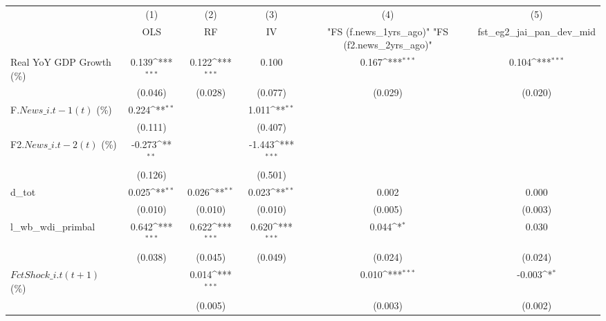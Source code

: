 {
\def\sym#1{\ifmmode^{#1}\else\(^{#1}\)\fi}
\begin{tabular}{l*{5}{c}}
\toprule
                    &\multicolumn{1}{c}{(1)}&\multicolumn{1}{c}{(2)}&\multicolumn{1}{c}{(3)}&\multicolumn{1}{c}{(4)}&\multicolumn{1}{c}{(5)}\\
                    &\multicolumn{1}{c}{OLS}&\multicolumn{1}{c}{RF}&\multicolumn{1}{c}{IV}&\multicolumn{1}{c}{ "FS (f.news\_1yrs\_ago)"  "FS (f2.news\_2yrs\_ago)" }&\multicolumn{1}{c}{fst\_eg2\_jai\_pan\_dev\_mid}\\
\midrule
Real YoY GDP Growth (\%)&       0.139\sym{***}&       0.122\sym{***}&       0.100         &       0.167\sym{***}&       0.104\sym{***}\\
                    &     (0.046)         &     (0.028)         &     (0.077)         &     (0.029)         &     (0.020)         \\
\addlinespace
F.$ News\_{i.t-1}(t)$ (\%)&       0.224\sym{**} &                     &       1.011\sym{**} &                     &                     \\
                    &     (0.111)         &                     &     (0.407)         &                     &                     \\
\addlinespace
F2.$ News\_{i.t-2}(t)$ (\%)&      -0.273\sym{**} &                     &      -1.443\sym{***}&                     &                     \\
                    &     (0.126)         &                     &     (0.501)         &                     &                     \\
\addlinespace
d\_tot               &       0.025\sym{**} &       0.026\sym{**} &       0.023\sym{**} &       0.002         &       0.000         \\
                    &     (0.010)         &     (0.010)         &     (0.010)         &     (0.005)         &     (0.003)         \\
\addlinespace
l\_wb\_wdi\_primbal    &       0.642\sym{***}&       0.622\sym{***}&       0.620\sym{***}&       0.044\sym{*}  &       0.030         \\
                    &     (0.038)         &     (0.045)         &     (0.049)         &     (0.024)         &     (0.024)         \\
\addlinespace
$ FctShock\_{i.t}(t+1)$ (\%)&                     &       0.014\sym{***}&                     &       0.010\sym{***}&      -0.003\sym{*}  \\
                    &                     &     (0.005)         &                     &     (0.003)         &     (0.002)         \\

\end{tabular}}

